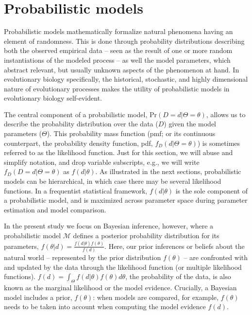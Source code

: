 \documentclass[oneside]{article}
\begin{document}

\section*{Probabilistic models}
\label{sec:prob_models}

Probabilistic models mathematically formalize natural phenomena
having an element of randomness.
This is done through probability distributions describing both the observed
empirical data -- seen as the result of one or more random instantiations of the modeled process -- as well the model parameters, which abstract relevant, but usually unknown aspects of the phenomenon at hand.
In evolutionary biology specifically, the historical, stochastic, and highly dimensional nature of evolutionary processes makes the utility of probabilistic models in evolutionary biology self-evident. 

The central component of a probabilistic model, $\text{Pr}(D=d|\Theta=\theta)$, allows us to describe the probability distribution over the data ($D$) given the model parameters ($\Theta$).
This probability mass function (pmf; or its continuous counterpart, the probability density function, pdf, $f_D(d|\Theta=\theta)$) is sometimes referred to as the likelihood function.
Just for this section, we will abuse and simplify notation, and drop variable subscripts, e.g., we will write $f_D(D=d|\Theta=\theta)$  as $f(d|\theta)$.
As illustrated in the next sections, probabilistic models can be hierarchical, in which case there may be several likelihood functions.
In a frequentist statistical framework, $f(d|\theta)$ is the sole component of a probabilistic model, and is maximized across parameter space during parameter estimation and model comparison.

In the present study we focus on Bayesian inference, however, where a probabilistic model $\mathcal{M}$ defines a posterior  probability distribution for its parameters, $f(\theta|d) = \frac{f(d|\theta)f(\theta)}{f(d)}$.
Here, our prior inferences or beliefs about the natural world -- represented by the prior distribution $f(\theta)$ -- are confronted with and updated by the data through the likelihood function (or multiple likelihood functions).
$f(d) = \int_\Theta f(d|\theta)f(\theta)d\theta$, the probability of the data, is also known as the marginal likelihood or the model evidence.
Crucially, a Bayesian model includes a prior, $f(\theta)$: when models are compared, for example, $f(\theta)$ needs to be taken into account when computing the model evidence $f(d)$.
\end{document}

